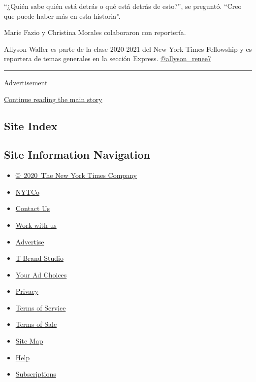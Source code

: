 ``¿Quién sabe quién está detrás o qué está detrás de esto?'', se
preguntó. ``Creo que puede haber más en esta historia''.

Marie Fazio y Christina Morales colaboraron con reportería.

Allyson Waller es parte de la clase 2020-2021 del New York Times
Fellowship y es reportera de temas generales en la sección Express.
\href{https://twitter.com/allyson_renee7}{@allyson\_renee7}

\begin{center}\rule{0.5\linewidth}{\linethickness}\end{center}

Advertisement

\protect\hyperlink{after-bottom}{Continue reading the main story}

\hypertarget{site-index}{%
\subsection{Site Index}\label{site-index}}

\hypertarget{site-information-navigation}{%
\subsection{Site Information
Navigation}\label{site-information-navigation}}

\begin{itemize}
\tightlist
\item
  \href{https://help.nytimes.com/hc/en-us/articles/115014792127-Copyright-notice}{©~2020~The
  New York Times Company}
\end{itemize}

\begin{itemize}
\tightlist
\item
  \href{https://www.nytco.com/}{NYTCo}
\item
  \href{https://help.nytimes.com/hc/en-us/articles/115015385887-Contact-Us}{Contact
  Us}
\item
  \href{https://www.nytco.com/careers/}{Work with us}
\item
  \href{https://nytmediakit.com/}{Advertise}
\item
  \href{http://www.tbrandstudio.com/}{T Brand Studio}
\item
  \href{https://www.nytimes.com/privacy/cookie-policy\#how-do-i-manage-trackers}{Your
  Ad Choices}
\item
  \href{https://www.nytimes.com/privacy}{Privacy}
\item
  \href{https://help.nytimes.com/hc/en-us/articles/115014893428-Terms-of-service}{Terms
  of Service}
\item
  \href{https://help.nytimes.com/hc/en-us/articles/115014893968-Terms-of-sale}{Terms
  of Sale}
\item
  \href{https://spiderbites.nytimes.com}{Site Map}
\item
  \href{https://help.nytimes.com/hc/en-us}{Help}
\item
  \href{https://www.nytimes.com/subscription?campaignId=37WXW}{Subscriptions}
\end{itemize}

